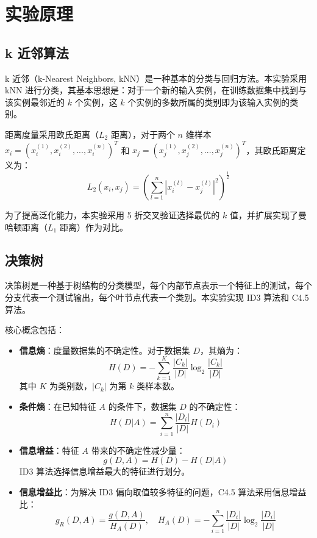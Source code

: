 \documentclass{SCNU_Experimental_Report}
\begin{document}
\maketitle

\section{实验原理}
\subsection{k 近邻算法}
k 近邻（k-Nearest Neighbors, kNN）是一种基本的分类与回归方法。本实验采用 kNN 进行分类，其基本思想是：对于一个新的输入实例，在训练数据集中找到与该实例最邻近的 \(k\) 个实例，这 \(k\) 个实例的多数所属的类别即为该输入实例的类别。

距离度量采用欧氏距离（\(L_2\) 距离），对于两个 \(n\) 维样本 \(x_i = (x_i^{(1)}, x_i^{(2)}, ..., x_i^{(n)})^T\) 和 \(x_j = (x_j^{(1)}, x_j^{(2)}, ..., x_j^{(n)})^T\)，其欧氏距离定义为：
\[
    L_2(x_i, x_j) = \left( \sum_{l=1}^n |x_i^{(l)} - x_j^{(l)}|^2 \right)^{\frac{1}{2}}
\]

为了提高泛化能力，本实验采用 5 折交叉验证选择最优的 \(k\) 值，并扩展实现了曼哈顿距离（\(L_1\) 距离）作为对比。

\subsection{决策树}
决策树是一种基于树结构的分类模型，每个内部节点表示一个特征上的测试，每个分支代表一个测试输出，每个叶节点代表一个类别。本实验实现 ID3 算法和 C4.5 算法。

核心概念包括：
\begin{itemize}
    \item \textbf{信息熵}：度量数据集的不确定性。对于数据集 \(D\)，其熵为：
          \[
              H(D) = -\sum_{k=1}^{K} \frac{|C_k|}{|D|} \log_2 \frac{|C_k|}{|D|}
          \]
          其中 \(K\) 为类别数，\(|C_k|\) 为第 \(k\) 类样本数。
    \item \textbf{条件熵}：在已知特征 \(A\) 的条件下，数据集 \(D\) 的不确定性：
          \[
              H(D|A) = \sum_{i=1}^{n} \frac{|D_i|}{|D|} H(D_i)
          \]
    \item \textbf{信息增益}：特征 \(A\) 带来的不确定性减少量：
          \[
              g(D, A) = H(D) - H(D|A)
          \]
          ID3 算法选择信息增益最大的特征进行划分。
    \item \textbf{信息增益比}：为解决 ID3 偏向取值较多特征的问题，C4.5 算法采用信息增益比：
          \[
              g_R(D, A) = \frac{g(D, A)}{H_A(D)}, \quad H_A(D) = -\sum_{i=1}^{n} \frac{|D_i|}{|D|} \log_2 \frac{|D_i|}{|D|}
          \]
\end{itemize}
\end{document}
